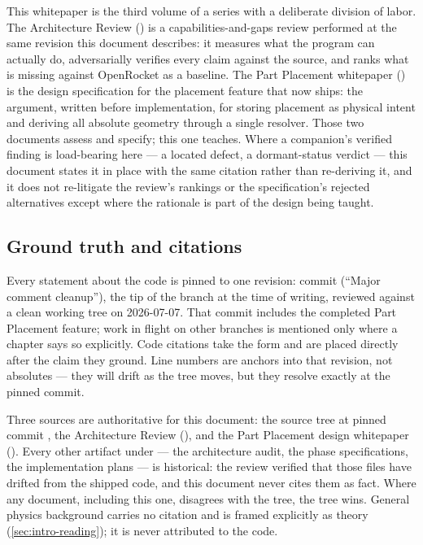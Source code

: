 This whitepaper is the third volume of a series with a deliberate division of labor. The
Architecture Review () is a capabilities-and-gaps review
performed at the same revision this document describes: it measures what the program can
actually do, adversarially verifies every claim against the source, and ranks what is
missing against OpenRocket as a baseline. The Part Placement whitepaper
() is the design specification for the placement
feature that now ships: the argument, written before implementation, for storing placement
as physical intent and deriving all absolute geometry through a single resolver. Those two
documents assess and specify; this one teaches. Where a companion's verified finding is
load-bearing here --- a located defect, a dormant-status verdict --- this document states it
in place with the same citation rather than re-deriving it, and it does not re-litigate the
review's rankings or the specification's rejected alternatives except where the rationale is
part of the design being taught.

\subsection{Ground truth and citations}\label{sec:intro-groundtruth}

Every statement about the code is pinned to one revision: commit  (``Major
comment cleanup''), the tip of the  branch at the time of writing,
reviewed against a clean working tree on 2026-07-07. That commit includes the completed Part
Placement feature; work in flight on other branches is mentioned only where a chapter says
so explicitly. Code citations take the form  and are placed
directly after the claim they ground. Line numbers are anchors into that revision, not
absolutes --- they will drift as the tree moves, but they resolve exactly at the pinned
commit.

\begin{designrule}
Three sources are authoritative for this document: the source tree at pinned commit
, the Architecture Review (), and the Part
Placement design whitepaper (). Every other artifact
under  --- the architecture audit, the phase specifications, the implementation
plans --- is historical: the review verified that those files have drifted from the shipped
code, and this document never cites them as fact. Where any document, including this one,
disagrees with the tree, the tree wins. General physics background carries no citation and
is framed explicitly as theory (\cref{sec:intro-reading}); it is never attributed to the
code.
\end{designrule}

